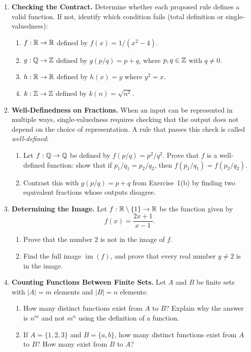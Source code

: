 \begin{enumerate}
\item \textbf{Checking the Contract.} Determine whether each proposed rule defines a valid function. If not, identify which condition fails (total definition or single-valuedness):
\begin{enumerate}[label=(\alph*)]
\item $f: \mathbb{R} \to \mathbb{R}$ defined by $f(x) = 1/(x^2 - 4)$.
\item $g: \mathbb{Q} \to \mathbb{Z}$ defined by $g(p/q) = p + q$, where $p, q \in \mathbb{Z}$ with $q \neq 0$.
\item $h: \mathbb{R} \to \mathbb{R}$ defined by $h(x) = y$ where $y^2 = x$.
\item $k: \mathbb{Z} \to \mathbb{Z}$ defined by $k(n) = \sqrt{n^2}$.
\end{enumerate}

\item \textbf{Well-Definedness on Fractions.} When an input can be represented in multiple ways, single-valuedness requires checking that the output does not depend on the choice of representation. A rule that passes this check is called \emph{well-defined}:
\begin{enumerate}[label=(\alph*)]
\item Let $f: \mathbb{Q} \to \mathbb{Q}$ be defined by $f(p/q) = p^2 / q^2$. Prove that $f$ is a well-defined function: show that if $p_1/q_1 = p_2/q_2$, then $f(p_1/q_1) = f(p_2/q_2)$.
\item Contrast this with $g(p/q) = p + q$ from Exercise~1(b) by finding two equivalent fractions whose outputs disagree.
\end{enumerate}

\item \textbf{Determining the Image.} Let $f: \mathbb{R} \setminus \{1\} \to \mathbb{R}$ be the function given by 
\[
f(x) = \frac{2x+1}{x-1}.
\]
\begin{enumerate}[label=(\alph*)]
\item Prove that the number $2$ is not in the image of $f$.
\item Find the full image $\operatorname{im}(f)$, and prove that every real number $y \neq 2$ is in the image.
\end{enumerate}

\item \textbf{Counting Functions Between Finite Sets.} Let $A$ and $B$ be finite sets with $|A| = m$ elements and $|B| = n$ elements:
\begin{enumerate}[label=(\alph*)]
\item How many distinct functions exist from $A$ to $B$? Explain why the answer is $n^m$ and not $m^n$ using the definition of a function.
\item If $A = \{1, 2, 3\}$ and $B = \{a, b\}$, how many distinct functions exist from $A$ to $B$? How many exist from $B$ to $A$?
\end{enumerate}


\end{enumerate}
